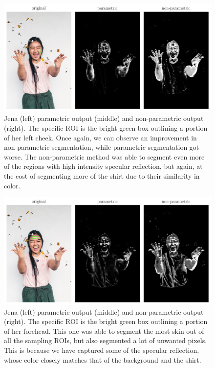 \documentclass[12pt,a4paper]{article}
\begin{document}
\begin{figure}[htb]
	\centering
	\includegraphics[width=\textwidth]{jena_cheek_out.png}
	\caption{Jena (left) parametric output (middle) and non-parametric output (right). The specific ROI is the bright green box outlining a portion of her left cheek. Once again, we can observe an improvement in non-parametric segmentation, while parametric segmentation got worse. The non-parametric method was able to segment even more of the regions with high intensity specular reflection, but again, at the cost of segmenting more of the shirt due to their similarity in color.}
	\label{fig:jena-cheek}
\end{figure}

\begin{figure}[htb]
	\centering
	\includegraphics[width=\textwidth]{jena_forehead_out.png}
	\caption{Jena (left) parametric output (middle) and non-parametric output (right). The specific ROI is the bright green box outlining a portion of her forehead. This one was able to segment the most skin out of all the sampling ROIs, but also segmented a lot of unwanted pixels. This is because we have captured some of the specular reflection, whose color closely matches that of the background and the shirt.}
	\label{fig:jena-forehead}
\end{figure}
\end{document}
